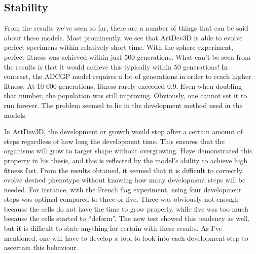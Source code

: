 \subsection{Stability}
From the results we've seen so far, there are a number of things that can be said about these models. Most prominently, we see that ArtDev3D is able to evolve perfect specimens within relatively short time. With the sphere experiment, perfect fitness was achieved within just 500 generations. What can't be seen from the results is that it would achieve this typically within 50 generations! In contrast, the ADCGP model requires a lot of generations in order to reach higher fitness. At 10 000 generations, fitness rarely exceeded 0.9. Even when doubling that number, the population was still improving. Obviously, one cannot set it to run forever. The problem seemed to lie in the development method used in the models.

In ArtDev3D, the development or growth would stop after a certain amount of steps regardless of how long the development time. This ensures that the organisms will grow to target shape without overgrowing. H{\o}ye demonstrated this property in his thesis\cite{hoye2006}, and this is reflected by the model's ability to achieve high fitness fast. From the results obtained, it seemed that it is difficult to correctly evolve desired phenotype without knowing how many development steps will be needed. For instance, with the French flag experiment, using four development steps was optimal compared to three or five. Three was obviously not enough because the cells do not have the time to grow properly, while five was too much because the cells started to ``deform''. The new test showed this tendency as well, but it is difficult to state anything for certain with these results. As I've mentioned, one will have to develop a tool to look into each development step to ascertain this behaviour.
